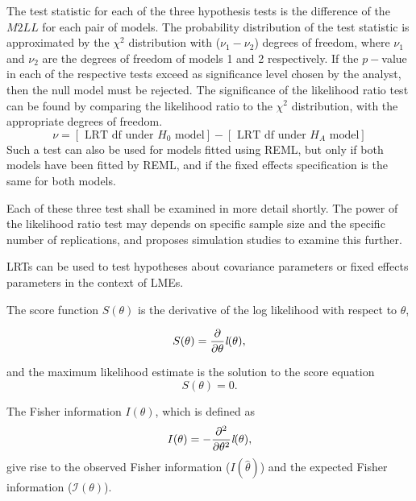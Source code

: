 \documentclass[12pt, a4paper]{report}
\theoremstyle{plain}
\theoremstyle{definition}
\theoremstyle{remark}
\begin{document}
	The test statistic for each of the three hypothesis tests is the difference of the $M2LL$ for each pair of models. 	The probability distribution of the test statistic is approximated by the $\chi^2$ distribution with ($\nu_{1} - \nu_{2}$) degrees of freedom, where $\nu_{1}$ and $\nu_{2}$ are the degrees of freedom of models 1 and 2 respectively. If the $p-$value in each of the respective tests exceed as significance level chosen by the analyst, then the null model must be rejected. The significance of the likelihood ratio test can be found by comparing the likelihood ratio to the $\chi^2$ distribution, with the appropriate degrees of freedom.
	\begin{equation}
	\nu = [\mbox{ LRT df under }H_{0} \mbox{ model}] - [\mbox{ LRT df under }H_{A} \mbox{ model}]
	\end{equation}
	Such a test can also be used for models fitted using REML, but only if both models have been fitted by REML, and if the fixed effects specification is the same for both models.
	
	Each of these three test shall be examined in more detail shortly.
	The power of the likelihood ratio test may depends on specific sample size and the specific number of replications, and \citet{ARoy2009} proposes simulation studies to examine this further.
	
	
	
	LRTs can be used to test hypotheses about
	covariance parameters or fixed effects parameters in the context
	of LMEs.
	
	
	
	The score function $S(\theta)$ is the derivative of the log likelihood with respect to $\theta$,
	
	\[
	S(\theta) = \frac{\partial}{\partial \theta}\emph{l}(\theta),
	\]
	
	and the maximum likelihood estimate is the solution to the score equation
	\[
	S(\theta) = 0.
	\]
	
	
	The Fisher information $I(\theta)$, which is defined as
	\[
	I(\theta) = - \frac{\partial^2}{\partial \theta^2}\emph{l}(\theta),
	\]
	give rise to the observed Fisher information ($I(\hat{\theta})$) and the expected Fisher information ($\mathcal{I}(\theta)$).
	
	
	
	
	
	
	
	
	
	
	
	

	
	
\end{document}
